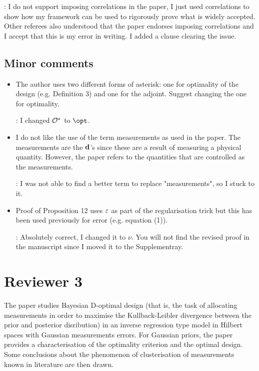 \documentclass{amsart}
\begin{document}
\answer: I do not support imposing correlations in the paper, I just
used correlations to show how my framework can be used to rigorously
prove what is widely accepted. Other referees also understood that the
paper endorses imposing correlations and I accept that this is my
error in writing. I added a clause clearing the issue.

\subsection{Minor comments}
\begin{itemize}
\item The author uses two different forms of asterisk: one for
  optimality of the design (e.g. Definition 3) and one for the
  adjoint. Suggest changing the one for optimality.

  \answer: I changed $\mathcal{O}^\star$ to $\opt$.
  
\item I do not like the use of the term measurements as used in the
  paper. The measurements are the $\mathbf{d}$’s since these are a result
  of measuring a physical quantity. However, the paper refers to the
  quantities that are controlled as the measurements.

  \answer: I was not able to find a better term to replace
  "measurements", so I stuck to it.
  
\item Proof of Proposition 12 uses $\varepsilon$ as part of the
  regularisation trick but this has been used previously for error
  (e.g. equation (1)).

  \answer: Absolutely correct, I changed it to $\nu$. You will not
  find the revised proof in the manuscript since I moved it to the
  Supplementray.
\end{itemize}




\section{Reviewer 3}
The paper studies Bayesian D-optimal design (that is, the task of
allocating measurements in order to maximise the Kullback-Leibler
divergence between the prior and posterior disribution) in an inverse
regression type model in Hilbert spaces with Gaussian measurements
errors. For Gaussian priors, the paper provides a characterisation of
the optimality criterion and the optimal design. Some conclusions
about the phenomenon of clusterisation of measurements known in
literature are then drawn.
\end{document}
